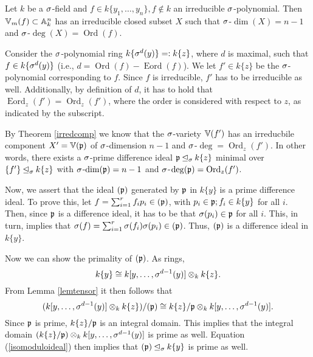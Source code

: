 \begin{theorem}\label{corfinal}
Let $k$ be a $\sigma$-field and $f \in k\{y_1,\ldots,y_n\}, f \notin k$ an irreducible $\sigma$-polynomial. 
Then $\mathbb{V}_m(f) \subset \mathbb{A}_k^n$ has an irreducible closed subset $X$ such that $\sigma$-$\dim(X) = n-1$ and $\sigma$-$\operatorname{deg}(X) = \operatorname{Ord}(f)$.
\begin{bew}
Consider the $\sigma$-polynomial ring $k\{\sigma^d(y)\} =: k\{z\}$, where $d$ is maximal, such that $f \in k\{\sigma^d(y)\}$ (i.e., $d = \operatorname{Ord}(f) - \operatorname{Eord}(f)$). We let $f'\in k\{z\}$ be the $\sigma$-polynomial corresponding to $f$. 
Since $f$ is irreducible, $f'$ has to be irreducible as well. Additionally, by definition of $d$, it has to hold that $\operatorname{Eord}_z(f') = \operatorname{Ord}_z(f')$, where the order is considered with respect to $z$,
as indicated by the subscript. 

By Theorem \ref{irredcomp} we know that the $\sigma$-variety $ \mathbb{V}(f')$ has an irreducbile component $X' = \mathbb{V}(\mathfrak{p})$ of $\sigma$-dimension $n-1$ and $\sigma$-$\operatorname{deg} = \operatorname{Ord}_z(f')$. In other words, there exists a $\sigma$-prime difference ideal $\mathfrak{p} \unlhd_{\sigma} k\{z\}$ minimal over $\{f'\} \unlhd_{\sigma} k\{z\}$ with
$\sigma$-$\dim(\mathfrak{p}) = n-1$ and $\sigma$-$\operatorname{deg}(\mathfrak{p}) = \operatorname{Ord}_z(f')$. 

Now, we assert that the ideal $(\mathfrak{p})$ generated by $\mathfrak{p}$ in $k\{y\}$ is a prime difference ideal. 
To prove this, let $f = \sum_{i=1}^r f_i p_i \in (\mathfrak{p})$, with $p_i \in \mathfrak{p}; f_i \in k\{y\}$ for all $i$. Then, since $\mathfrak{p}$ is a difference ideal, it has to be that $\sigma(p_i) \in \mathfrak{p}$ for all $i$.
This, in turn, implies that $\sigma(f) =  \sum_{i=1}^r \sigma(f_i) \sigma(p_i) \in (\mathfrak{p})$. Thus, $(\mathfrak{p})$ is a difference ideal in $k\{y\}$. 

Now we can show the primality of $(\mathfrak{p})$. As rings, $$k\{y\} \cong k[y,\ldots,\sigma^{d-1}(y)] \otimes_k k\{z\}.$$
From Lemma \ref{lemtensor} it then follows that 
\begin{equation}\label{isomoduloideal} (k[y,\ldots,\sigma^{d-1}(y)] \otimes_k k\{z\}) / (\mathfrak{p}) \cong k\{z\} / \mathfrak{p} \otimes_k k[y,\ldots,\sigma^{d-1}(y)]. \end{equation}
Since $\mathfrak{p}$ is prime, $k\{z\}/\mathfrak{p}$ is an integral domain. This implies that the integral domain $(k\{z\}/\mathfrak{p}) \otimes_k k[y,\ldots,\sigma^{d-1}(y)]$ is prime as well.
Equation (\ref{isomoduloideal}) then implies that $(\mathfrak{p}) \unlhd_{\sigma} k\{y\}$ is prime as well. 


\end{bew}
\end{theorem}
